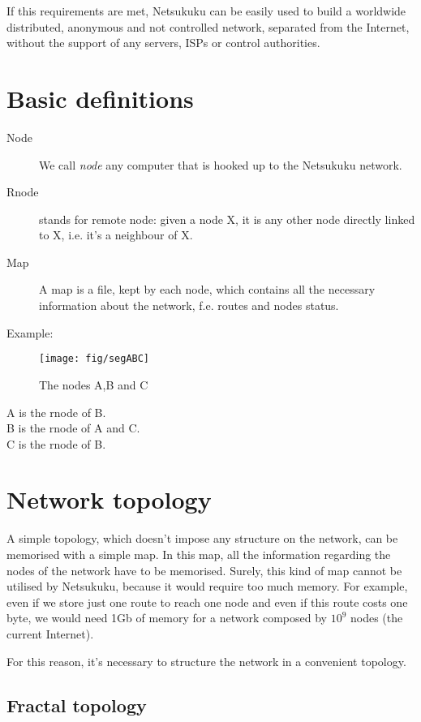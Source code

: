 \documentclass[a4paper]{article}
\begin{document}
If this requirements are met, Netsukuku can be easily used to build a worldwide
distributed, anonymous and not controlled network, separated from the
Internet, without the support of any servers, ISPs or control authorities.

\section{Basic definitions}

\begin{description}
	\item[Node] We call \emph{node} any computer that is hooked up to the
		Netsukuku network.
	\item[Rnode] stands for remote node: given a node X, it is any other
		node directly linked to X, i.e. it's a neighbour of X.
	\item[Map] A map is a file, kept by each node, which contains all the
		necessary information about the network, f.e. routes and nodes
		status.
\end{description}
Example:\\
\begin{figure}[h]
	\begin{center}
		\texttt{[image: fig/segABC]}
	\end{center}
	\caption{The nodes A,B and C}
\end{figure}
A is the rnode of B.\\
B is the rnode of A and C.\\
C is the rnode of B.

\section{Network topology}
\label{sec:net_topology}

A simple topology, which doesn't impose any structure on the network, can be
memorised with a simple map. In this map, all the information regarding the
nodes of the network have to be memorised. Surely, this kind of map cannot be
utilised by Netsukuku, because it would require too much memory.
For example, even if we store just one route to reach one node and even if
this route costs one byte, we would need 1Gb of memory for a network composed
by $10^9$ nodes (the current Internet).

For this reason, it's necessary to structure the network in a convenient
topology.

\subsection{Fractal topology}
\label{sec:fractal_topology}
\end{document}
